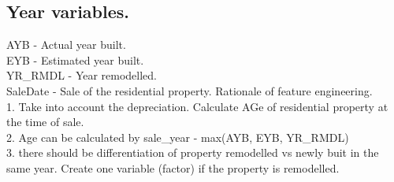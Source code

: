 \documentclass[]{article}
\begin{document}
\hypertarget{year-variables.}{%
\subsection{Year variables.}\label{year-variables.}}

AYB - Actual year built.\\
EYB - Estimated year built.\\
YR\_RMDL - Year remodelled.\\
SaleDate - Sale of the residential property. Rationale of feature
engineering.\\
1. Take into account the depreciation. Calculate AGe of residential
property at the time of sale.\\
2. Age can be calculated by sale\_year - max(AYB, EYB, YR\_RMDL)\\
3. there should be differentiation of property remodelled vs newly buit
in the same year. Create one variable (factor) if the property is
remodelled.
\end{document}
